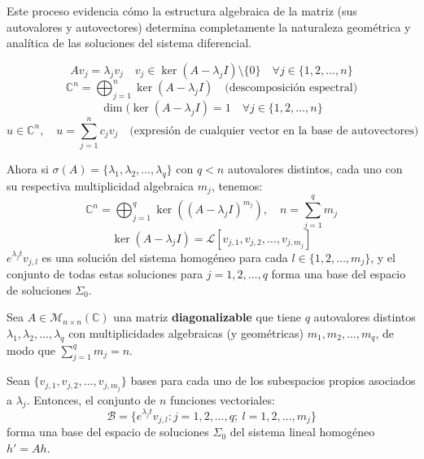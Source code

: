 Este proceso evidencia cómo la estructura algebraica de la matriz (sus autovalores y autovectores) determina completamente la naturaleza geométrica y analítica de las soluciones del sistema diferencial.

\[
    A v_j = \lambda_j v_j \quad v_j \in \ker(A - \lambda_j I) \setminus \{0\} \quad \forall j \in \{1, 2, \dots, n\}
\]
\[
    \mathbb{C}^n = \bigoplus_{j=1}^n \ker(A - \lambda_j I) \quad \text{(descomposición espectral)}
\]
\[
    \dim(\ker(A - \lambda_j I) = 1 \quad \forall j \in \{1, 2, \dots, n\}
\]
\[
    u \in \mathbb{C}^n, \quad u = \sum_{j=1}^n c_j v_j \quad \text{(expresión de cualquier vector en la base de autovectores)}
\]

Ahora si $\sigma(A) = \{\lambda_1, \lambda_2, \dots, \lambda_q\}$ con $q < n$ autovalores distintos, cada uno con su respectiva multiplicidad algebraica $m_j$, tenemos:
\[
    \mathbb{C}^n = \bigoplus_{j=1}^q \ker((A - \lambda_j I)^{m_j}), \quad n = \sum_{j=1}^q m_j
\]
\[
    \ker(A - \lambda_j I) = \mathcal{L} [v_{j,1}, v_{j,2}, \dots, v_{j,m_j}]
\]
$e^{\lambda_j t} v_{j,l}$ es una solución del sistema homogéneo para cada $l \in \{1, 2, \dots, m_j\}$, y el conjunto de todas estas soluciones para $j = 1, 2, \dots, q$ forma una base del espacio de soluciones $\Sigma_0$.

\begin{teorema}
    Sea $A \in \mathcal{M}_{n \times n}(\mathbb{C})$ una matriz \textbf{diagonalizable} que tiene $q$ autovalores distintos $\lambda_1, \lambda_2, \dots, \lambda_q$ con multiplicidades algebraicas (y geométricas) $m_1, m_2, \dots, m_q$, de modo que $\sum_{j=1}^q m_j = n$. 
    
    Sean $\{v_{j,1}, v_{j,2}, \dots, v_{j,m_j}\}$ bases para cada uno de los subespacios propios asociados a $\lambda_j$. Entonces, el conjunto de $n$ funciones vectoriales:
    \[
        \mathcal{B} = \{ e^{\lambda_j t} v_{j,l} : j = 1, 2, \dots, q; \ l = 1, 2, \dots, m_j \}
    \]
    forma una base del espacio de soluciones $\Sigma_0$ del sistema lineal homogéneo $h' = Ah$.
\end{teorema}

